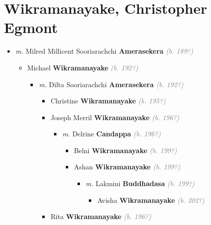 \documentclass[10pt, openany]{book}
\begin{document}
\chapter{Wikramanayake, Christopher Egmont}
\label{00004150}
\textcolor{slmaroon}{\textit{}}
\begin{itemize}
\item{\textit{m.} Milred Millicent Sooriarachchi \textbf{Amerasekera} \textcolor{gray}{\textit{(b. 189?)}}   \label{couple:00004150:00004151} \begin{itemize}
\item{Michael \textbf{Wikramanayake} \textcolor{gray}{\textit{(b. 192?)}}
\begin{itemize}
\item{\textit{m.} Dilta Sooriarachchi \textbf{Amerasekera} \textcolor{gray}{\textit{(b. 192?)}}   \label{couple:00004152:00004153} \begin{itemize}
\item{Christine \textbf{Wikramanayake} \textcolor{gray}{\textit{(b. 195?)}}
 }
\item{Joseph Merril \textbf{Wikramanayake} \textcolor{gray}{\textit{(b. 196?)}}
\begin{itemize}
\item{\textit{m.} Delrine \textbf{Candappa} \textcolor{gray}{\textit{(b. 196?)}}   \label{couple:00004155:00004156} \begin{itemize}
\item{Belni \textbf{Wikramanayake} \textcolor{gray}{\textit{(b. 199?)}}
 }
\item{Ashan \textbf{Wikramanayake} \textcolor{gray}{\textit{(b. 199?)}}
\begin{itemize}
\item{\textit{m.} Lakmini \textbf{Buddhadasa} \textcolor{gray}{\textit{(b. 199?)}}   \label{couple:00004158:00004159} \begin{itemize}
\item{Avisha \textbf{Wikramanayake} \textcolor{gray}{\textit{(b. 202?)}}
 }
\end{itemize}}
\end{itemize}
 }
\end{itemize}}
\end{itemize}
  }
\item{Rita \textbf{Wikramanayake} \textcolor{gray}{\textit{(b. 196?)}}
 }

\end{itemize}}
\end{itemize}}
\end{itemize}}
\end{itemize}
\end{document}
